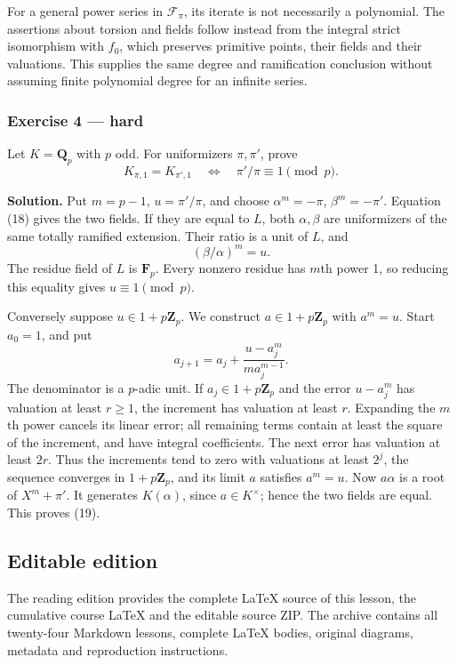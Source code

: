 \documentclass[11pt,a4paper]{article}
\begin{document}
For a general power series in \(\mathcal F_\pi\), its iterate is not
necessarily a polynomial. The assertions about torsion and fields follow
instead from the integral strict isomorphism with \(f_0\), which
preserves primitive points, their fields and their valuations. This
supplies the same degree and ramification conclusion without assuming
finite polynomial degree for an infinite series.

\subsubsection{Exercise 4 --- hard}\label{exercise-4-hard}

Let \(K=\mathbf Q_p\) with \(p\) odd. For uniformizers \(\pi,\pi'\),
prove \[
K_{\pi,1}=K_{\pi',1}
\quad\Longleftrightarrow\quad
\pi'/\pi\equiv1\pmod p.
\tag{19}
\]

\textbf{Solution.} Put \(m=p-1\), \(u=\pi'/\pi\), and choose
\(\alpha^m=-\pi\), \(\beta^m=-\pi'\). Equation (18) gives the two
fields. If they are equal to \(L\), both \(\alpha,\beta\) are
uniformizers of the same totally ramified extension. Their ratio is a
unit of \(L\), and \[
(\beta/\alpha)^m=u.
\] The residue field of \(L\) is \(\mathbf F_p\). Every nonzero residue
has \(m\)th power 1, so reducing this equality gives
\(u\equiv1\pmod p\).

Conversely suppose \(u\in1+p\mathbf Z_p\). We construct
\(a\in1+p\mathbf Z_p\) with \(a^m=u\). Start \(a_0=1\), and put \[
a_{j+1}=a_j+\frac{u-a_j^m}{m a_j^{m-1}}.
\] The denominator is a \(p\)-adic unit. If \(a_j\in1+p\mathbf Z_p\) and
the error \(u-a_j^m\) has valuation at least \(r\geq1\), the increment
has valuation at least \(r\). Expanding the \(m\)th power cancels its
linear error; all remaining terms contain at least the square of the
increment, and have integral coefficients. The next error has valuation
at least \(2r\). Thus the increments tend to zero with valuations at
least \(2^j\), the sequence converges in \(1+p\mathbf Z_p\), and its
limit \(a\) satisfies \(a^m=u\). Now \(a\alpha\) is a root of
\(X^m+\pi'\). It generates \(K(\alpha)\), since \(a\in K^\times\); hence
the two fields are equal. This proves (19).

\subsection{Editable edition}\label{editable-edition}

The reading edition provides the complete LaTeX source of this lesson,
the cumulative course LaTeX and the editable source ZIP. The archive
contains all twenty-four Markdown lessons, complete LaTeX bodies,
original diagrams, metadata and reproduction instructions.
\end{document}
